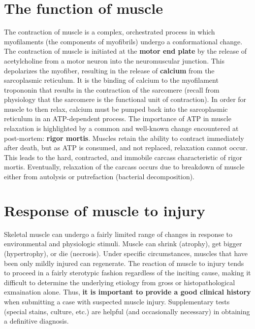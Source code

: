 \documentclass[openany]{report}
\begin{document}
\section{The function of muscle}\label{the-function-of-muscle}

The contraction of muscle is a complex, orchestrated process in which
myofilaments (the components of myofibrils) undergo a conformational
change. The contraction of muscle is initiated at the \textbf{motor end
plate} by the release of acetylcholine from a motor neuron into the
neuromuscular junction. This depolarizes the myofiber, resulting in the
release of \textbf{calcium} from the sarcoplasmic reticulum. It is the
binding of calcium to the myofilament tropononin that results in the
contraction of the sarcomere (recall from physiology that the sarcomere
is the functional unit of contraction). In order for muscle to then
relax, calcium must be pumped back into the sarcoplasmic reticulum in an
ATP-dependent process. The importance of ATP in muscle relaxation is
highlighted by a common and well-known change encountered at
post-mortem: \textbf{rigor mortis}. Muscles retain the ability to
contract immediately after death, but as ATP is consumed, and not
replaced, relaxation cannot occur. This leads to the hard, contracted,
and immobile carcass characteristic of rigor mortis. Eventually,
relaxation of the carcass occurs due to breakdown of muscle either from
autolysis or putrefaction (bacterial decomposition).

\section{Response of muscle to
injury}\label{response-of-muscle-to-injury}

Skeletal muscle can undergo a fairly limited range of changes in
response to environmental and physiologic stimuli. Muscle can shrink
(atrophy), get bigger (hypertrophy), or die (necrosis). Under specific
circumstances, muscles that have been only mildly injured can
regenerate. The reaction of muscle to injury tends to proceed in a
fairly sterotypic fashion regardless of the inciting cause, making it
difficult to determine the underlying etiology from gross or
histopathological exmaination alone. Thus, \textbf{it is important to
provide a good clinical history} when submitting a case with suspected
muscle injury. Supplementary tests (special stains, culture, etc.) are
helpful (and occasionally necessary) in obtaining a definitive
diagnosis.
\end{document}
